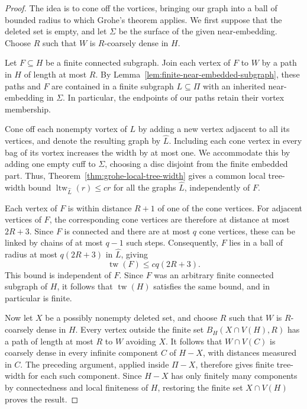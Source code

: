 \documentclass[a4paper]{amsart}
\begin{document}
\begin{proof}
The idea is to cone off the vortices, bringing our graph into a ball of bounded radius to which Grohe's theorem applies. We first suppose that the deleted set is empty, and let $\Sigma$ be the surface of the given near-embedding. Choose $R$ such that $W$ is $R$-coarsely dense in $H$.

Let $F\subseteq H$ be a finite connected subgraph. Join each vertex of $F$ to $W$ by a path in $H$ of length at most $R$. By Lemma~\ref{lem:finite-near-embedded-subgraph}, these paths and $F$ are contained in a finite subgraph $L\subseteq\Pi$ with an inherited near-embedding in $\Sigma$. In particular, the endpoints of our paths retain their vortex membership.

Cone off each nonempty vortex of $L$ by adding a new vertex adjacent to all its vertices, and denote the resulting graph by $\widehat L$. Including each cone vertex in every bag of its vortex increases the width by at most one. We accommodate this by adding one empty cuff to $\Sigma$, choosing a disc disjoint from the finite embedded part. Thus, Theorem~\ref{thm:grohe-local-tree-width} gives a common local tree-width bound $\operatorname{ltw}_{\widehat L}(r) \leq cr$ for all the graphs $\widehat L$, independently of $F$.

Each vertex of $F$ is within distance $R+1$ of one of the cone vertices. For adjacent vertices of $F$, the corresponding cone vertices are therefore at distance at most $2R+3$. Since $F$ is connected and there are at most $q$ cone vertices, these can be linked by chains of at most $q-1$ such steps. Consequently, $F$ lies in a ball of radius at most $q(2R+3)$ in $\widehat L$, giving
$$
\operatorname{tw}(F)\leq cq(2R+3).
$$
This bound is independent of $F$. Since $F$ was an arbitrary finite connected subgraph of $H$, it follows that $\operatorname{tw}(H)$ satisfies the same bound, and in particular is finite. 

Now let $X$ be a possibly nonempty deleted set, and choose $R$ such that $W$ is $R$-coarsely dense in $H$. Every vertex outside the finite set $B_H(X\cap V(H),R)$ has a path of length at most $R$ to $W$ avoiding $X$. It follows that $W\cap V(C)$ is coarsely dense in every infinite component $C$ of $H-X$, with distances measured in $C$. The preceding argument, applied inside $\Pi-X$, therefore gives finite tree-width for each such component. Since $H-X$ has only finitely many components by connectedness and local finiteness of $H$, restoring the finite set $X\cap V(H)$ proves the result.
\end{proof}
\end{document}

